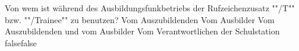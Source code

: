     {Von wem ist während des Ausbildungsfunkbetriebs der Rufzeichenzusatz ""/T"" bzw. ""/Trainee"" zu benutzen?}
    {Vom Auszubildenden}
    {Vom Ausbilder}
    {Vom Auszubildenden und vom Ausbilder}
    {Vom Verantwortlichen der Schulstation}
    {false}{false}